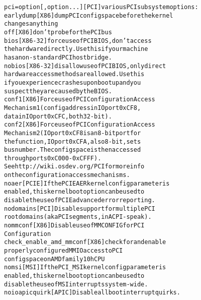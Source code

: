 \documentclass[a4paper,8pt,english]{sphinxmanual}
\begin{document}
\begin{alltt}
        pci=option{[},option...{]}  {[}PCI{]} various PCI subsystem options:
                earlydump       {[}X86{]} dump PCI config space before the kernel
                                changes anything
                off             {[}X86{]} don't probe for the PCI bus
                bios            {[}X86-32{]} force use of PCI BIOS, don't access
                                the hardware directly. Use this if your machine
                                has a non-standard PCI host bridge.
                nobios          {[}X86-32{]} disallow use of PCI BIOS, only direct
                                hardware access methods are allowed. Use this
                                if you experience crashes upon bootup and you
                                suspect they are caused by the BIOS.
                conf1           {[}X86{]} Force use of PCI Configuration Access
                                Mechanism 1 (config address in IO port 0xCF8,
                                data in IO port 0xCFC, both 32-bit).
                conf2           {[}X86{]} Force use of PCI Configuration Access
                                Mechanism 2 (IO port 0xCF8 is an 8-bit port for
                                the function, IO port 0xCFA, also 8-bit, sets
                                bus number. The config space is then accessed
                                through ports 0xC000-0xCFFF).
                                See http://wiki.osdev.org/PCI for more info
                                on the configuration access mechanisms.
                noaer           {[}PCIE{]} If the PCIEAER kernel config parameter is
                                enabled, this kernel boot option can be used to
                                disable the use of PCIE advanced error reporting.
                nodomains       {[}PCI{]} Disable support for multiple PCI
                                root domains (aka PCI segments, in ACPI-speak).
                nommconf        {[}X86{]} Disable use of MMCONFIG for PCI
                                Configuration
                check\_enable\_amd\_mmconf {[}X86{]} check for and enable
                                properly configured MMIO access to PCI
                                config space on AMD family 10h CPU
                nomsi           {[}MSI{]} If the PCI\_MSI kernel config parameter is
                                enabled, this kernel boot option can be used to
                                disable the use of MSI interrupts system-wide.
                noioapicquirk   {[}APIC{]} Disable all boot interrupt quirks.

\end{alltt}
\end{document}

